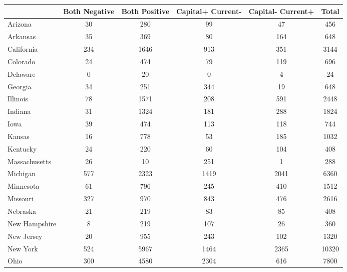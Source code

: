 \begin{tabular}{l*{5}{c}}
\toprule
            &Both Negative&Both Positive&Capital+ Current-&Capital- Current+&       Total\\
\midrule
Arizona     &          30&         280&          99&          47&         456\\
Arkansas    &          35&         369&          80&         164&         648\\
California  &         234&        1646&         913&         351&        3144\\
Colorado    &          24&         474&          79&         119&         696\\
Delaware    &           0&          20&           0&           4&          24\\
Georgia     &          34&         251&         344&          19&         648\\
Illinois    &          78&        1571&         208&         591&        2448\\
Indiana     &          31&        1324&         181&         288&        1824\\
Iowa        &          39&         474&         113&         118&         744\\
Kansas      &          16&         778&          53&         185&        1032\\
Kentucky    &          24&         220&          60&         104&         408\\
Massachusetts&          26&          10&         251&           1&         288\\
Michigan    &         577&        2323&        1419&        2041&        6360\\
Minnesota   &          61&         796&         245&         410&        1512\\
Missouri    &         327&         970&         843&         476&        2616\\
Nebraska    &          21&         219&          83&          85&         408\\
New Hampshire&           8&         219&         107&          26&         360\\
New Jersey  &          20&         955&         243&         102&        1320\\
New York    &         524&        5967&        1464&        2365&       10320\\
Ohio        &         300&        4580&        2304&         616&        7800\\

\end{tabular}

